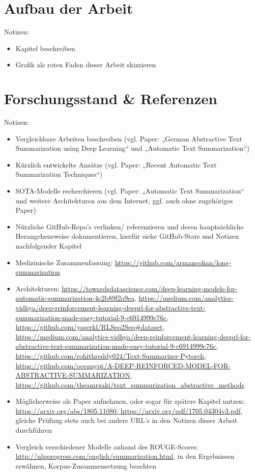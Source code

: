 \section{Aufbau der Arbeit}
Notizen:
\begin{itemize}
	\item Kapitel beschreiben
	\item Grafik als roten Faden dieser Arbeit skizzieren
\end{itemize}


\section{Forschungsstand \& Referenzen}
Notizen:
\begin{itemize}
	\item Vergleichbare Arbeiten beschreiben (vgl. Paper: „German Abstractive Text Summarization using Deep Learning“ und „Automatic Text Summarization“)
	\item Kürzlich entwickelte Ansätze (vgl. Paper: „Recent Automatic Text Summarization Techniques“)
	\item SOTA-Modelle recherchieren (vgl. Paper: „Automatic Text Summarization“ und weitere Architekturen aus dem Internet, ggf. auch ohne zugehöriges Paper)
	\item Nützliche GitHub-Repo's verlinken/ referenzieren und deren hauptsächliche Herangehensweise dokumentieren, hierfür siehe GitHub-Stars und Notizen nachfolgender Kapitel
	\item Medizinische Zusammenfassung: \url{https://github.com/armancohan/long-summarization}
	\item Architekturen: \url{https://towardsdatascience.com/deep-learning-models-for-automatic-summarization-4c2b89f2a9ea}, \url{https://medium.com/analytics-vidhya/deep-reinforcement-learning-deeprl-for-abstractive-text-summarization-made-easy-tutorial-9-c6914999c76c}, \url{https://github.com/yaserkl/RLSeq2Seq#dataset}, \url{https://medium.com/analytics-vidhya/deep-reinforcement-learning-deeprl-for-abstractive-text-summarization-made-easy-tutorial-9-c6914999c76c}, \url{https://github.com/rohithreddy024/Text-Summarizer-Pytorch}, \url{https://github.com/oceanypt/A-DEEP-REINFORCED-MODEL-FOR-ABSTRACTIVE-SUMMARIZATION}, \url{https://github.com/theamrzaki/text_summurization_abstractive_methods}
	\item Möglicherweise als Paper aufnehmen, oder sogar für spätere Kapitel nutzen: \url{https://arxiv.org/abs/1805.11080, https://arxiv.org/pdf/1705.04304v3.pdf}, gleiche Prüfung stets auch bei andere URL's in den Notizen dieser Arbeit durchführen
	\item Vergleich verschiedener Modelle anhand des ROUGE-Scores: \url{http://nlpprogress.com/english/summarization.html}, in den Ergebnissen erwähnen, Korpus-Zusammensetzung beachten
\end{itemize}
